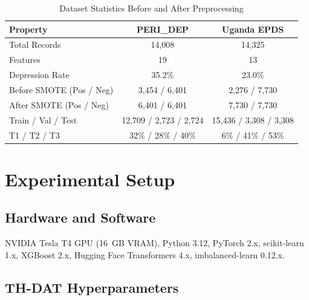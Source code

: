 \documentclass[12pt,a4paper]{article}
\begin{document}
\begin{table}[htbp]
\caption{Dataset Statistics Before and After Preprocessing}
\label{tab:datastats}
\centering
\begin{tabular}{lcc}
\toprule
\textbf{Property} & \textbf{PERI\_DEP} & \textbf{Uganda EPDS} \\
\midrule
Total Records & 14,008 & 14,325 \\
Features & 19 & 13 \\
Depression Rate & 35.2\% & 23.0\% \\
Before SMOTE (Pos / Neg) & 3,454 / 6,401 & 2,276 / 7,730 \\
After SMOTE (Pos / Neg) & 6,401 / 6,401 & 7,730 / 7,730 \\
Train / Val / Test & 12,709 / 2,723 / 2,724 & 15,436 / 3,308 / 3,308 \\
T1 / T2 / T3 & 32\% / 28\% / 40\% & 6\% / 41\% / 53\% \\
\bottomrule
\end{tabular}
\end{table}

\section{Experimental Setup}

\subsection{Hardware and Software}
NVIDIA Tesla T4 GPU (16~GB VRAM), Python 3.12, PyTorch 2.x, scikit-learn 1.x, XGBoost 2.x, Hugging Face Transformers 4.x, imbalanced-learn 0.12.x.

\subsection{TH-DAT Hyperparameters}
\end{document}
